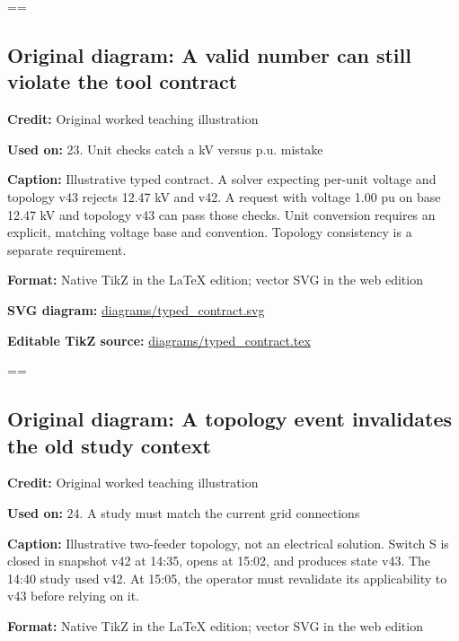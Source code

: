 \documentclass[10pt,letterpaper]{article}
\begin{document}
\egroup\par\noindent\box\readingEntry\par\medskip
\setbox\readingEntry=\vbox\bgroup\hsize=\linewidth\subsection*{Original diagram: A valid number can still violate the tool contract}
\textbf{Credit:} Original worked teaching illustration\par
\textbf{Used on:} 23. Unit checks catch a kV versus p.u. mistake\par
\textbf{Caption:} Illustrative typed contract. A solver expecting per-unit voltage and topology v43 rejects 12.47 kV and v42. A request with voltage 1.00 pu on base 12.47 kV and topology v43 can pass those checks. Unit conversion requires an explicit, matching voltage base and convention. Topology consistency is a separate requirement.\par
\textbf{Format:} Native TikZ in the LaTeX edition; vector SVG in the web edition\par
\textbf{SVG diagram:} \href{diagrams/typed_contract.svg}{\small\ttfamily diagrams/\allowbreak{}typed\_\allowbreak{}contract.\allowbreak{}svg}\par
\textbf{Editable TikZ source:} \href{diagrams/typed_contract.tex}{\small\ttfamily diagrams/\allowbreak{}typed\_\allowbreak{}contract.\allowbreak{}tex}\par
\egroup\par\noindent\box\readingEntry\par\medskip
\setbox\readingEntry=\vbox\bgroup\hsize=\linewidth\subsection*{Original diagram: A topology event invalidates the old study context}
\textbf{Credit:} Original worked teaching illustration\par
\textbf{Used on:} 24. A study must match the current grid connections\par
\textbf{Caption:} Illustrative two-feeder topology, not an electrical solution. Switch S is closed in snapshot v42 at 14:35, opens at 15:02, and produces state v43. The 14:40 study used v42. At 15:05, the operator must revalidate its applicability to v43 before relying on it.\par
\textbf{Format:} Native TikZ in the LaTeX edition; vector SVG in the web edition\par
\end{document}
